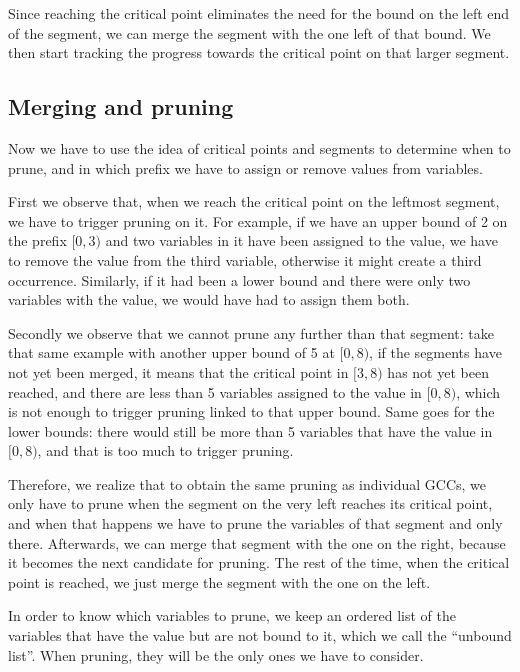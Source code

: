 \documentclass[a4paper,10pt]{article}
\begin{document}
Since reaching the critical point eliminates the need for the bound on the left end of the segment, we can merge the segment with the one left of that bound. We then start tracking the progress towards the critical point on that larger segment.

\subsection{Merging and pruning}
\label{subsec:merging-pruning}

Now we have to use the idea of critical points and segments to determine when to prune, and in which prefix we have to assign or remove values from variables.

First we observe that, when we reach the critical point on the leftmost segment, we have to trigger pruning on it. For example, if we have an upper bound of 2 on the prefix $[0,3)$ and two variables in it have been assigned to the value, we have to remove the value from the third variable, otherwise it might create a third occurrence. Similarly, if it had been a lower bound and there were only two variables with the value, we would have had to assign them both.

Secondly we observe that we cannot prune any further than that segment: take that same example with another upper bound of 5 at $[0,8)$, if the segments have not yet been merged, it means that the critical point in $[3,8)$ has not yet been reached, and there are less than 5 variables assigned to the value in $[0,8)$, which is not enough to trigger pruning linked to that upper bound. Same goes for the lower bounds: there would still be more than 5 variables that have the value in $[0,8)$, and that is too much to trigger pruning.

Therefore, we realize that to obtain the same pruning as individual GCCs, we only have to prune when the segment on the very left reaches its critical point, and when that happens we have to prune the variables of that segment and only there. Afterwards, we can merge that segment with the one on the right, because it becomes the next candidate for pruning. The rest of the time, when the critical point is reached, we just merge the segment with the one on the left.

In order to know which variables to prune, we keep an ordered list of the variables that have the value but are not bound to it, which we call the ``unbound list''. When pruning, they will be the only ones we have to consider.
\end{document}
